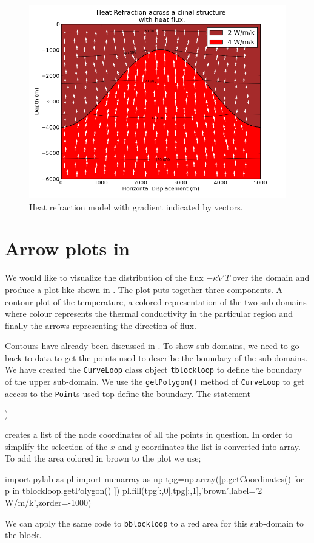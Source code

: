 \begin{figure}[ht]
\centerline{\includegraphics[width=5.in]{figures/heatrefractionflux}}
\caption{Heat refraction model with gradient indicated by vectors.}
\label{fig:hr001qumodel}
\end{figure}

\section{Arrow plots in \mpl}
We would like to visualize the distribution of the flux $-\kappa \nabla T$ over the domain 
and produce a plot like shown in . 
The plot puts together three components. A contour plot of the temperature,
a colored representation of the two sub-domains where colour represents the thermal conductivity 
in the particular region and finally the arrows representing the direction of flux.

Contours have already been discussed in . To show sub-domains, 
we need to go back to \pycad data to get the points used to describe the boundary of the 
sub-domains. We have created the \verb|CurveLoop| class object 
\verb|tblockloop| to define the boundary of the upper sub-domain. 
We use the \verb|getPolygon()| method of \verb|CurveLoop| to get
access to the \verb|Point|s used top define the boundary. The statement
\begin{python}
)
\end{python}
creates a list of the node coordinates of all the points in question. In order 
to simplify the selection of the $x$ and $y$ coordinates the list is converted 
into \modnumpy array. To add the area colored in brown to the plot we use; 
\begin{python}
import pylab as pl
import numarray as np
tpg=np.array([p.getCoordinates() for p in tblockloop.getPolygon() ])
pl.fill(tpg[:,0],tpg[:,1],'brown',label='2 W/m/k',zorder=-1000)
\end{python}
We can apply the same code to \verb|bblockloop| to a red area for this sub-domain to the block.

